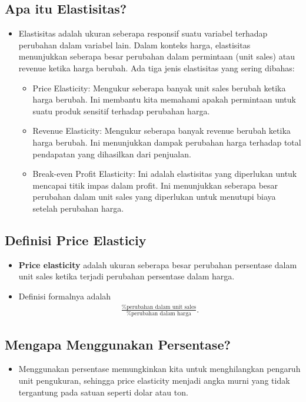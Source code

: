 \documentclass{article}
\begin{document}
\subsection{Apa itu Elastisitas?}
\begin{itemize}
    \item Elastisitas adalah ukuran seberapa responsif suatu variabel terhadap perubahan dalam variabel lain. Dalam konteks harga, elastisitas menunjukkan seberapa besar perubahan dalam permintaan (unit sales) atau revenue ketika harga berubah. Ada tiga jenis elastisitas yang sering dibahas:
          \begin{itemize}
              \item Price Elasticity: Mengukur seberapa banyak unit sales berubah ketika harga berubah. Ini membantu kita memahami apakah permintaan untuk suatu produk sensitif terhadap perubahan harga.
              \item Revenue Elasticity: Mengukur seberapa banyak revenue berubah ketika harga berubah. Ini menunjukkan dampak perubahan harga terhadap total pendapatan yang dihasilkan dari penjualan.
              \item Break-even Profit Elasticity: Ini adalah elastisitas yang diperlukan untuk mencapai titik impas dalam profit. Ini menunjukkan seberapa besar perubahan dalam unit sales yang diperlukan untuk menutupi biaya setelah perubahan harga.
          \end{itemize}
\end{itemize}

\subsection{Definisi Price Elasticiy}
\begin{itemize}
    \item \textbf{Price elasticity} adalah ukuran seberapa besar perubahan persentase dalam unit sales ketika terjadi perubahan persentase dalam harga.
    \item Definisi formalnya adalah
          \begin{align*}
              \frac{\% \text{perubahan dalam unit sales}}{\% \text{perubahan dalam harga}}.
          \end{align*}
\end{itemize}

\subsection{Mengapa Menggunakan Persentase?}
\begin{itemize}
    \item Menggunakan persentase memungkinkan kita untuk menghilangkan pengaruh unit pengukuran, sehingga price elasticity menjadi angka murni yang tidak tergantung pada satuan seperti dolar atau ton.
\end{itemize}
\end{document}
